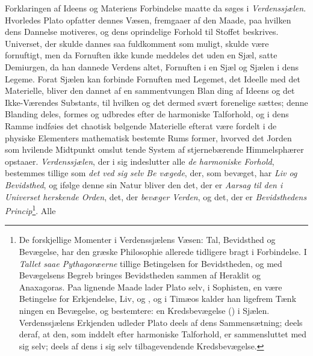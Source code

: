Forklaringen af Ideens og Materiens Forbindelse maatte
da søges i \emph{Verdenssjælen}. Hvorledes Plato opfatter dennes
Væsen, fremgaaer af den Maade, paa hvilken dens Dannelse
motiveres, og dens oprindelige Forhold til Stoffet beskrives.
Universet, der skulde dannes saa fuldkomment som muligt,
skulde være fornuftigt, men da Fornuften ikke kunde meddeles
det uden en Sjæl, satte Demiurgen, da han dannede Verdens\-%
altet, Fornuften i en Sjæl og Sjælen i dens Legeme. Forat
Sjælen kan forbinde Fornuften med Legemet, det Ideelle med
det Materielle, bliver den dannet af en sammentvungen Blan\-%
ding af Ideens og det Ikke-Værendes Substants, til hvilken 
og det dermed svært forenelige  sættes; denne Blanding
deles, formes og udbredes efter de harmoniske Talforhold, og i dens
Ramme indføies det chaotisk bølgende Materielle efterat være
fordelt i de physiske Elementers mathematisk bestemte Rums\-%
former, hvorved det Jorden som hvilende Midtpunkt omslut\-%
tende System af stjernebærende Himmelsphærer opstaaer.
\emph{Verdenssjælen}, der i sig indeslutter alle \emph{de harmoniske
Forhold}, bestemmes tillige som \emph{det ved sig selv Be\-%
vægede}, der, som bevæget, har \emph{Liv og Bevidsthed}, og
ifølge denne sin Natur bliver den det, der er \emph{Aarsag til
den i Universet herskende Orden}, det, der \emph{bevæger
Verden}, og det, der er \emph{Bevidsthedens Princip}\footnote{De forskjellige
Momenter i Verdenssjælens Væsen: Tal, Bevidsthed
og Bevægelse, har den græske Philosophie allerede tidligere bragt
i Forbindelse. I \emph{Tallet saae Pythagoræerne} tillige Betingelsen
for Bevidstheden, og med Bevægelsens Begreb bringes Bevidstheden
sammen af Heraklit og Anaxagoras. Paa lignende Maade lader
Plato selv, i Sophisten, en  være Betingelse for Erkjendelse,
Liv,  og , og i Timæos kalder han ligefrem Tænk\-%
ningen en Bevægelse, og bestemtere: en Kredsbevægelse
() i Sjælen. Verdenssjælens Erkjenden udleder Plato deels af dens
Sammensætning; deels deraf, at den, som inddelt efter harmoniske
Talforhold, er sammensluttet med sig selv; deels af dens i sig selv
tilbagevendende Kredsbevægelse.}. Alle
